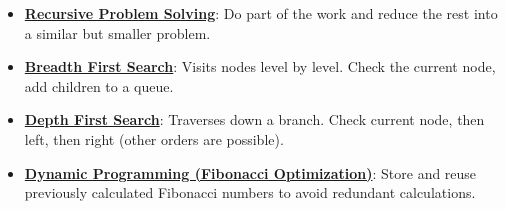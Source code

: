 \documentclass{article}%
\begin{document}
\begin{itemize}[leftmargin=*]%
\item \href{https://purdue.brightspace.com/d2l/common/assets/pdfjs-d2l-dist/1.0.14-legacy/web/viewer.html?file=%2Fcontent%2Fenforced%2F1095467-wl.202510.CS.24300.001%2F14L1-DepthFS.pdf%3Fou%3D1095467&lang=en-us&container=d2l-fileviewer-rendered-pdf&fullscreen=d2l-fileviewer-rendered-pdf-dialog&height=667#page=4}{\textbf{Recursive Problem Solving}}: Do part of the work and reduce the rest into a similar but smaller problem.%
\item \href{https://purdue.brightspace.com/d2l/common/assets/pdfjs-d2l-dist/1.0.14-legacy/web/viewer.html?file=%2Fcontent%2Fenforced%2F1095467-wl.202510.CS.24300.001%2F14L1-DepthFS.pdf%3Fou%3D1095467&lang=en-us&container=d2l-fileviewer-rendered-pdf&fullscreen=d2l-fileviewer-rendered-pdf-dialog&height=667#page=8}{\textbf{Breadth First Search}}: Visits nodes level by level. Check the current node, add children to a queue.%
\item \href{https://purdue.brightspace.com/d2l/common/assets/pdfjs-d2l-dist/1.0.14-legacy/web/viewer.html?file=%2Fcontent%2Fenforced%2F1095467-wl.202510.CS.24300.001%2F14L1-DepthFS.pdf%3Fou%3D1095467&lang=en-us&container=d2l-fileviewer-rendered-pdf&fullscreen=d2l-fileviewer-rendered-pdf-dialog&height=667#page=8}{\textbf{Depth First Search}}: Traverses down a branch. Check current node, then left, then right (other orders are possible).%
\item \href{https://purdue.brightspace.com/d2l/common/assets/pdfjs-d2l-dist/1.0.14-legacy/web/viewer.html?file=%2Fcontent%2Fenforced%2F1095467-wl.202510.CS.24300.001%2F14L1-DepthFS.pdf%3Fou%3D1095467&lang=en-us&container=d2l-fileviewer-rendered-pdf&fullscreen=d2l-fileviewer-rendered-pdf-dialog&height=667#page=23}{\textbf{Dynamic Programming (Fibonacci Optimization)}}: Store and reuse previously calculated Fibonacci numbers to avoid redundant calculations.%
\end{itemize}%
\end{document}

